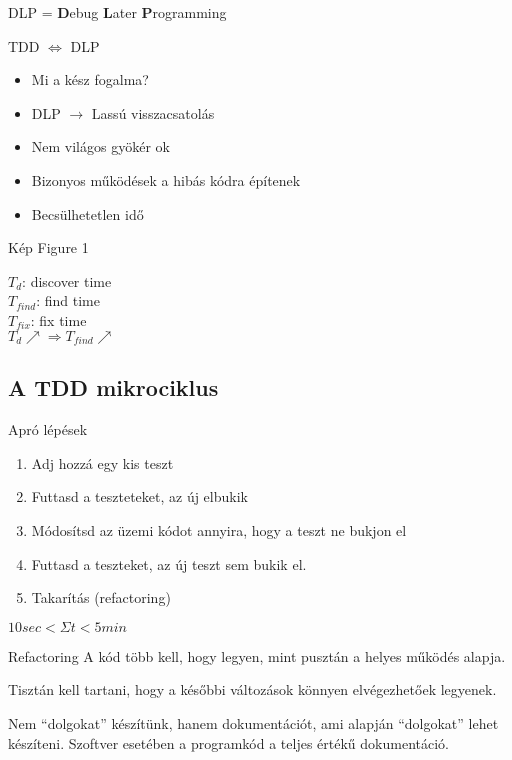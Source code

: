 \begin{frame}
  DLP = \textbf{D}ebug \textbf{L}ater \textbf{P}rogramming
\end{frame}

\begin{frame}{TDD $\Leftrightarrow$ DLP}
  \begin{itemize}[<+->]
  \item Mi a kész fogalma?
  \item DLP $\rightarrow$ Lassú visszacsatolás
  \item Nem világos gyökér ok
  \item Bizonyos működések a hibás kódra építenek
  \item Becsülhetetlen idő
  \end{itemize}
\end{frame}

\begin{frame}{Kép}
  Figure 1

  $T_d$: discover time \\
  $T_{find}$: find time \\
  $T_{fix}$: fix time \\
  $T_d \nearrow \Rightarrow T_{find} \nearrow$
\end{frame}

\subsection{A TDD mikrociklus}
\begin{frame}{Apró lépések}
  \begin{enumerate}[<+->]
  \item Adj hozzá egy kis teszt
  \item Futtasd a teszteteket, az új elbukik
  \item Módosítsd az üzemi kódot annyira, hogy a teszt ne bukjon el
  \item Futtasd a teszteket, az új teszt sem bukik el.
  \item Takarítás (refactoring)
  \end{enumerate}

  \pause
  $10 sec < \Sigma t < 5 min$
\end{frame}

\begin{frame}{Refactoring}
  A kód több kell, hogy legyen, mint pusztán a helyes működés alapja.

  \pause

  Tisztán kell tartani, hogy a későbbi változások könnyen elvégezhetőek legyenek.

  \pause

  Nem ``dolgokat'' készítünk, hanem dokumentációt, ami alapján
  ``dolgokat'' lehet készíteni. Szoftver esetében a programkód a
  teljes értékű dokumentáció.
\end{frame}

